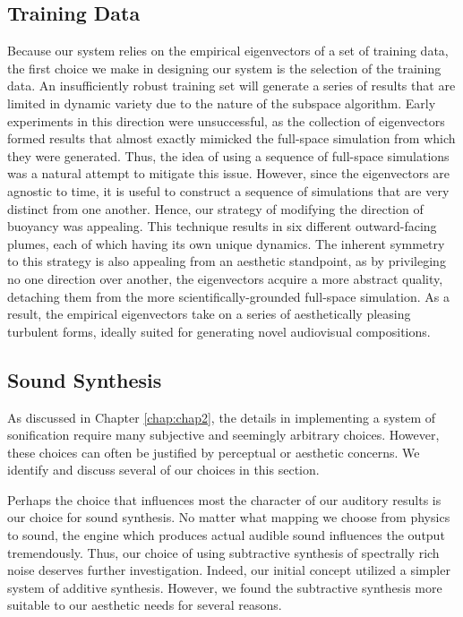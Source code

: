 \subsection{Training Data}
Because our system relies on the empirical eigenvectors of a set of training data, the first choice we make in designing our system is the selection of the training data. An insufficiently robust training set will generate a series of results that are limited in dynamic variety due to the nature of the subspace algorithm. Early experiments in this direction were unsuccessful, as the collection of eigenvectors formed results that almost exactly mimicked the full-space simulation from which they were generated. Thus, the idea of using a sequence of full-space simulations was a natural attempt to mitigate this issue. However, since the eigenvectors are agnostic to time, it is useful to construct a sequence of simulations that are very distinct from one another. Hence, our strategy of modifying the direction of buoyancy was appealing. This technique results in six different outward-facing plumes, each of which having its own unique dynamics. The inherent symmetry to this strategy is also appealing from an aesthetic standpoint, as by privileging no one direction over another, the eigenvectors acquire a more abstract quality, detaching them from the more scientifically-grounded full-space simulation. As a result, the empirical eigenvectors take on a series of aesthetically pleasing turbulent forms, ideally suited for generating novel audiovisual compositions.

\subsection{Sound Synthesis}
As discussed in Chapter \ref{chap:chap2}, the details in implementing a system of sonification require many subjective and seemingly arbitrary choices. However, these choices can often be justified by perceptual or aesthetic concerns. We identify and discuss several of our choices in this section.

Perhaps the choice that influences most the character of our auditory results is our choice for sound synthesis. No matter what mapping we choose from physics to sound, the engine which produces actual audible sound influences the output tremendously. Thus, our choice of using subtractive synthesis of spectrally rich noise deserves further investigation. Indeed, our initial concept utilized a simpler system of additive synthesis. However, we found the subtractive synthesis more suitable to our aesthetic needs for several reasons.

